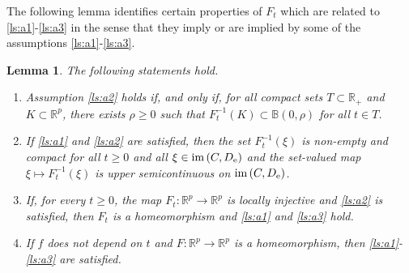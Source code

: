 \documentclass[a4paper,11pt]{article}
\newcommand{\B}{\mathbb B}
\newcommand{\R}{\mathbb R}
\numberwithin{equation}{section}
\numberwithin{figure}{section}
\numberwithin{table}{section}
\newtheorem{lemma}[theorem]{Lemma}
\begin{document}
The following lemma identifies certain properties of $F_t$ which are related to \ref{ls:a1}-\ref{ls:a3} in the sense that they imply or are implied by some of the
assumptions \ref{ls:a1}-\ref{ls:a3}.
%
\begin{lemma}\label{lem:assumptions}
The following statements hold.
\begin{enumerate}[label = {\bf (\arabic*)}, ref={\rm (\arabic*)}, leftmargin = 0ex, itemindent = 4.6ex]
%
\item\label{ls:assumptions_s_1}
Assumption \ref{ls:a2} holds if, and only if, for all compact sets $T\subset\R_+$ and $K\subset\R^p$, there exists $\rho\geq 0$ such that $F_t^{-1}(K)\subset\B(0,\rho)$ for all
$t\in T$.
%
\item\label{ls:assumptions_s_2}
If \ref{ls:a1} and \ref{ls:a2} are satisfied, then the set $F_t^{-1}(\xi)$ is non-empty and compact for all $t\geq 0$ and all $\xi\in {\rm im}\,(C,D_{\rm e})$ and the set-valued map $\xi\mapsto F_t^{-1}(\xi)$ is upper semicontinuous on ${\rm im}\,(C,D_{\rm e})$.
%
\item\label{ls:assumptions_s_3}
If, for every $t\geq 0$, the map $F_t:\R^p\to\R^p$ is locally injective and
\ref{ls:a2} is satisfied, then $F_t$ is a homeomorphism and \ref{ls:a1} and \ref{ls:a3} hold.
%
\item\label{ls:assumptions_s_4} If $f$ does not depend on $t$ and $F:\R^p\to\R^p$ is a homeomorphism, then \ref{ls:a1}-\ref{ls:a3} are satisfied.
\end{enumerate}
\end{lemma}
%
\end{document}
